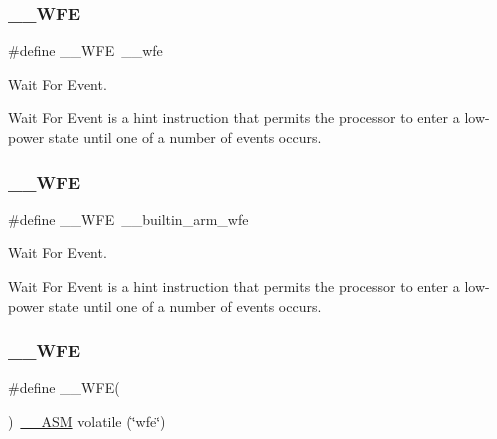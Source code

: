 \subsubsection{\texorpdfstring{\+\_\+\+\_\+\+W\+FE}{\_\_WFE}\hspace{0.1cm}{\footnotesize\ttfamily [1/3]}}
{\footnotesize\ttfamily \#define \+\_\+\+\_\+\+W\+FE~\+\_\+\+\_\+wfe}



Wait For Event. 

Wait For Event is a hint instruction that permits the processor to enter a low-\/power state until one of a number of events occurs. \mbox{\label{group___c_m_s_i_s___core___instruction_interface_gaac6cc7dd4325d9cb40d3290fa5244b3d}} 
\subsubsection{\texorpdfstring{\+\_\+\+\_\+\+W\+FE}{\_\_WFE}\hspace{0.1cm}{\footnotesize\ttfamily [2/3]}}
{\footnotesize\ttfamily \#define \+\_\+\+\_\+\+W\+FE~\+\_\+\+\_\+builtin\+\_\+arm\+\_\+wfe}



Wait For Event. 

Wait For Event is a hint instruction that permits the processor to enter a low-\/power state until one of a number of events occurs. \mbox{\label{group___c_m_s_i_s___core___instruction_interface_gaf0330712223f4cfb6091e4ab84775f73}} 
\subsubsection{\texorpdfstring{\+\_\+\+\_\+\+W\+FE}{\_\_WFE}\hspace{0.1cm}{\footnotesize\ttfamily [3/3]}}
{\footnotesize\ttfamily \#define \+\_\+\+\_\+\+W\+FE(\begin{DoxyParamCaption}{ }\end{DoxyParamCaption})~\mbox{\hyperlink{cmsis__iccarm_8h_a1378040bcf22428955c6e3ce9c2053cd}{\+\_\+\+\_\+\+A\+SM}} volatile (\char`\"{}wfe\char`\"{})}



